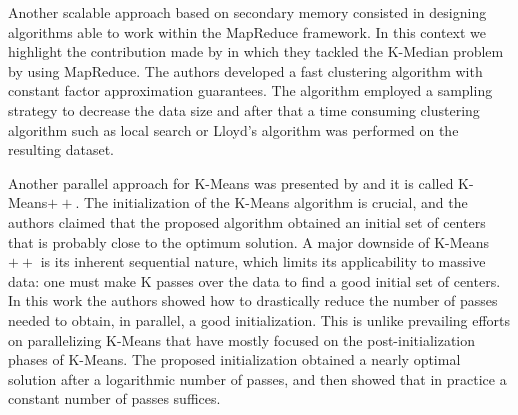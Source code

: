\documentclass[10pt]{article}
\begin{document}
Another scalable approach based on secondary memory consisted in designing algorithms able to work  within the MapReduce framework. %
In this context we highlight the contribution made %
by \citep{EIM11} in which they tackled the K-Median problem by using MapReduce.
The authors developed a fast clustering algorithm with constant factor approximation guarantees. The algorithm employed a sampling strategy to decrease the data size and after that a time consuming clustering algorithm such as local search or Lloyd's algorithm was performed on the resulting dataset. 

Another parallel approach for K-Means was presented by \citep{BMVKV12} and it is called K-Means$++$. The initialization of the K-Means algorithm is crucial, and the authors claimed that the proposed algorithm obtained an initial set of centers that is probably close to the optimum solution. A major downside of K-Means$++$ is its inherent sequential nature, which limits its applicability to massive data: one must make K passes over the data to find a good initial set of centers. In this work the
authors showed how to drastically reduce the number of passes needed to obtain, in parallel, a good initialization. This is unlike prevailing efforts on parallelizing K-Means that have mostly focused on the post-initialization phases of K-Means. The proposed initialization obtained a nearly optimal solution after a logarithmic number of passes, and then showed that in practice a constant number of passes suffices. 
\end{document}

